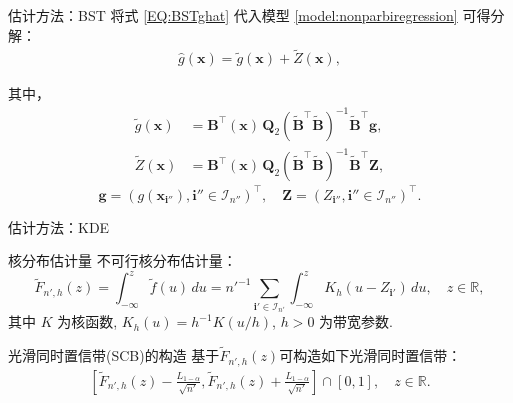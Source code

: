 \documentclass{beamer}
\begin{document}
\begin{frame}{估计方法：BST}
    将式 \eqref{EQ:BSTghat} 代入模型 \eqref{model:nonparbiregression}
可得分解：
\begin{align}\label{EQ:ghat}
  \hat{g}(\boldsymbol{x})
  = \tilde{g}(\boldsymbol{x}) + \tilde{Z}(\boldsymbol{x}),
\end{align}

其中，
\begin{align}\label{gtilde}
  \tilde{g}(\boldsymbol{x})
  &= \mathbf{B}^\top(\boldsymbol{x})\,\mathbf{Q}_2
     (\tilde{\mathbf{B}}^\top \tilde{\mathbf{B}})^{-1}
     \tilde{\mathbf{B}}^\top \mathbf{g},\\[0.3em]
\label{Ztilde}
  \tilde{Z}(\boldsymbol{x})
  &= \mathbf{B}^\top(\boldsymbol{x})\,\mathbf{Q}_2
     (\tilde{\mathbf{B}}^\top \tilde{\mathbf{B}})^{-1}
     \tilde{\mathbf{B}}^\top \mathbf{Z},
\end{align}
\[
\mathbf{g} = (g(\boldsymbol{x}_{\mathbf{i}''}), \mathbf{i}''\in \mathcal{I}_{n''})^\top,\quad
\mathbf{Z} = (Z_{\mathbf{i}''}, \mathbf{i}''\in \mathcal{I}_{n''})^\top.
\]
\end{frame}


\begin{frame}{估计方法：KDE}
\begin{block}{核分布估计量}
不可行核分布估计量：
\begin{equation}\label{EQ:Fn'tilde}
\tilde{F}_{n',h}(z)
= \int_{-\infty}^{z} \tilde{f}(u) \, du
= n'^{-1} \sum_{\mathbf{i}' \in \mathcal{I}_{n'}}
\int_{-\infty}^{z} K_h(u - Z_{\mathbf{i}'}) \, du, 
\quad z \in \mathbb{R},
\end{equation}
其中 $K$ 为核函数, $K_h(u) = h^{-1} K(u/h)$, $h>0$ 为带宽参数.
\end{block}
\begin{block}{光滑同时置信带(SCB)的构造}
基于$\tilde{F}_{n',h}(z)$可构造如下光滑同时置信带：
\begin{align} \label{SCB:Ftilden'}
    \left[ \tilde{F}_{n',h}(z) - \frac{L_{1-\alpha}}{\sqrt{n'}},\tilde{F}_{n',h}(z) + \frac{L_{1-\alpha}}{\sqrt{n'}} \right] \cap [0,1], \quad z \in \mathbb{R}.
\end{align}
\end{block}
\end{frame}
\end{document}
